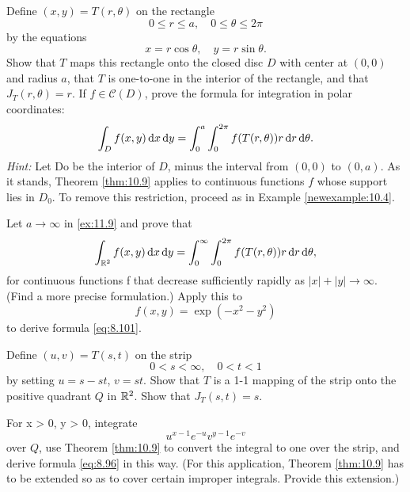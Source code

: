 \begin{myexercise}
    \label{ex:10.9}
    Define $(x, y) = T(r, \theta)$ on the rectangle
    \begin{equation*}
        0 \leq r \leq a,
        \quad
        0 \leq \theta \leq 2\pi
    \end{equation*}
    by the equations
    \begin{equation*}
        x = r \cos \theta , \quad
        y = r \sin \theta .
    \end{equation*}
    Show that $T$ maps this rectangle onto the closed disc $D$ with center at $(0, 0)$ and radius $a$,
    that $T$ is one-to-one in the interior of the rectangle, and that $J_T(r, \theta) = r$.
    If $f \in \mathscr{C}(D)$, prove the formula for integration in polar coordinates:
    \begin{equation*}
        \int_D f(x,y) \d x \d y =
        \int_{0}^{a} \int_{0}^{2\pi} f(T(r,\theta)) r \d r \d \theta .
    \end{equation*}
    \emph{Hint:} Let Do be the interior of $D$, minus the interval from $(0, 0)$ to $(0, a)$.
    As it stands, Theorem \ref{thm:10.9} applies to continuous functions $f$ whose support lies in $D_0$.
    To remove this restriction, proceed as in Example \ref{newexample:10.4}.
\end{myexercise}



\begin{myexercise}
    \label{ex:10.10}
    Let $a \rightarrow \infty$ in \ref{ex:11.9} and prove that
    \begin{equation*}
        \int_{\R^2} f(x,y) \d x \d y =
        \int_{0}^{\infty} \int_{0}^{2\pi} f(T(r,\theta)) r \d r \d \theta ,
    \end{equation*}
    for continuous functions f that decrease sufficiently rapidly as $|x | + | y | \rightarrow \infty$.
    (Find a more precise formulation.)
    Apply this to
    \begin{equation*}
        f(x, y) = \exp (-x^2 - y^2)
    \end{equation*}
    to derive formula \eqref{eq:8.101}.
\end{myexercise}


\begin{myexercise}
    \label{ex:10.11}
    Define $(u,v)=T(s,t)$ on the strip
    \begin{equation*}
        0<s<\infty , \quad
        0<t<1
    \end{equation*}
    by setting $u = s - st$, $v = st$.
    Show that $T$ is a 1-1 mapping of the strip onto the positive quadrant $Q$ in ${\protect\mathbb R}^2$.
    Show that $J_T(s, t) = s$.

    For x > 0, y > 0, integrate
    \begin{equation*}
        u^{x-1} e^{-u} v^{y-1} e^{-v}
    \end{equation*}
    over $Q$, use Theorem \ref{thm:10.9} to convert the integral to one over the strip, and derive formula \eqref{eq:8.96} in this way.
    (For this application, Theorem \ref{thm:10.9} has to be extended so as to cover certain improper integrals.
    Provide this extension.)
\end{myexercise}


